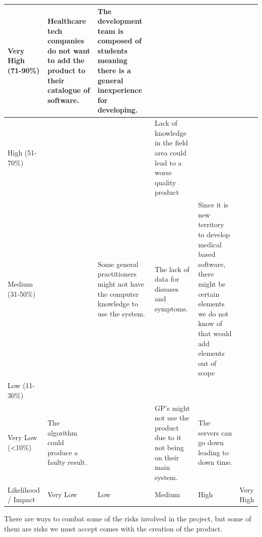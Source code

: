 \begin{center}
	\centering
	\begin{tabular}[h]{|p{3em}|p{5em}|p{5em}|p{5em}|p{5em}|p{5em}|}
		\hline
		{\scriptsize Very High (71-90\%)}  &  {\scriptsize Healthcare tech companies do not want to add the product to their catalogue of software.} & {\scriptsize The development team is composed of students meaning there is a general inexperience for developing.} & & &                                                                     \\ \hline                                                                                                                                                                                                                                                
		{\scriptsize High   (51-70\%)}   & & & {\scriptsize Lack of knowledge in the field area could lead to a worse quality product} & & \\ \hline
		{\scriptsize Medium (31-50\%)}  & & {\scriptsize Some general practitioners might not have the computer knowledge to use the system.} & {\scriptsize The lack of data for diseases and symptoms.} & {\scriptsize Since it is new territory to develop medical based software, there might be certain elements we do not know of that would add elements out of scope} & \\ \hline
		{\scriptsize Low   (11-30\%)}   & & & & & \\ \hline
		{\scriptsize Very Low (<10\%)} & {\scriptsize The algorithm could produce a faulty result.} & & {\scriptsize GP’s might not use the product due to it not being on their main system.} & {\scriptsize The servers can go down leading to down time.} & \\ \hline
		{\scriptsize Likelihood / Impact} &{\scriptsize Very Low} &{\scriptsize Low} &{\scriptsize Medium} &{\scriptsize High} &{\scriptsize Very High} \\ \hline
	\end{tabular}
\end{center} 
\pagebreak
There are ways to combat some of the risks involved in the project, but some of them are risks we must accept comes with the creation of the product.


